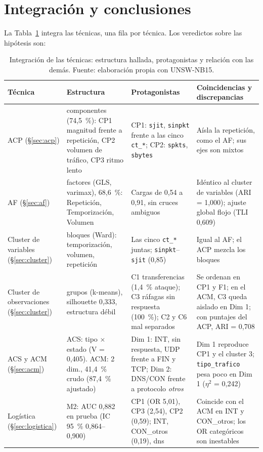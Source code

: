 \section{Integración y conclusiones}
\label{sec:integracion}

La Tabla~\ref{tab:integracion} integra las técnicas, una fila por técnica. Los veredictos sobre las hipótesis son:

\begin{table}[htbp]
  \centering
  \caption[Integración de las técnicas]{Integración de las técnicas: estructura hallada, protagonistas y relación con las demás. Fuente: elaboración propia con UNSW-NB15.}\label{tab:integracion}
  \begin{tablacompacta}
  \footnotesize
  \setlength{\tabcolsep}{3pt}
  \begin{tabularx}{\linewidth}{@{}>{\raggedright\arraybackslash}p{1.9cm}>{\raggedright\arraybackslash}X>{\raggedright\arraybackslash}X>{\raggedright\arraybackslash}X@{}}
  \toprule
  Técnica & Estructura & Protagonistas & Coincidencias y discrepancias \\
  \midrule
  ACP (§\ref{sec:acp}) & 3 componentes (74,5~\%): CP1 magnitud frente a repetición, CP2 volumen de tráfico, CP3 ritmo lento & CP1: \texttt{sjit}, \texttt{sinpkt} frente a las cinco \texttt{ct\_*}; CP2: \texttt{spkts}, \texttt{sbytes} & Aísla la repetición, como el AF; sus ejes son mixtos \\
  AF (§\ref{sec:af}) & 3 factores (GLS, varimax), 68,6~\%: Repetición, Temporización, Volumen & Cargas de 0,54 a 0,91, sin cruces ambiguos & Idéntico al cluster de variables (ARI = 1,000); ajuste global flojo (TLI 0,609) \\
  Cluster de variables (§\ref{sec:cluster}) & 3 bloques (Ward): temporización, volumen, repetición & Las cinco \texttt{ct\_*} juntas; \texttt{sinpkt}--\texttt{sjit} (0,85) & Igual al AF; el ACP mezcla los bloques \\
  Cluster de observaciones (§\ref{sec:cluster}) & 6 grupos (k-means), silhouette 0,333, estructura débil & C1 transferencias (1,4~\% ataque); C3 ráfagas sin respuesta (100~\%); C2 y C6 mal separados & Se ordenan en CP1 y F1; en el ACM, C3 queda aislado en Dim 1; con puntajes del ACP, ARI = 0,708 \\
  ACS y ACM (§\ref{sec:acm}) & ACS: tipo $\times$ estado (V = 0,405). ACM: 2 dim., 41,4~\% crudo (87,4~\% ajustado) & Dim 1: INT, sin respuesta, UDP frente a FIN y TCP; Dim 2: DNS/CON frente a protocolo \emph{otros} & Dim 1 reproduce CP1 y el cluster 3; \texttt{tipo\_trafico} pesa poco en Dim 1 ($\eta^2$ = 0,242) \\
  Logística (§\ref{sec:logistica}) & M2: AUC 0,882 en prueba (IC 95~\% 0,864--0,900) & CP1 (OR 5,01), CP3 (2,54), CP2 (0,59); INT, CON\_otros (0,19), dns & Coincide con el ACM en INT y CON\_otros; los OR categóricos son inestables \\
  \bottomrule
  \end{tabularx}
  \end{tablacompacta}
\end{table}


